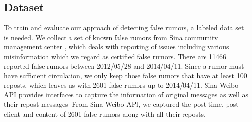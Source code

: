 \subsection{Dataset}
\label{sec:data}
To train and evaluate our approach of detecting false rumors, a labeled
data set is needed.
We collect a set of known false rumors from Sina community management center \cite{website:Manage},
which deals with reporting
of issues including various misinformation which we regard as
certified false rumors.
There are 11466 reported false rumors between 2012/05/28 and 2014/04/11.
Since a rumor must have sufficient circulation, we only keep those false
rumors that have at least 100 reposts, which leaves us with 2601 false rumors
up to 2014/04/11.
Sina Weibo API provides interfaces to capture the information of
original messages as well as their repost messages.
From Sina Weibo API, we captured the post time, post client
and content of 2601 false rumors along with all their reposts.

